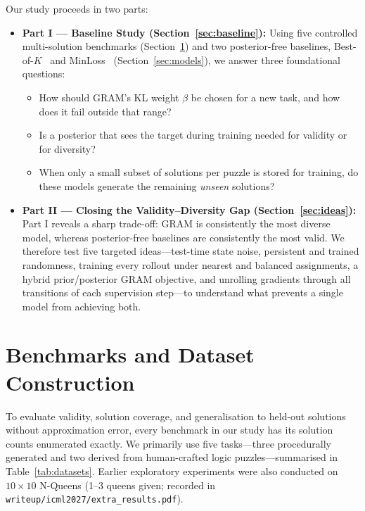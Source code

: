 \documentclass[11pt]{article}
\newcommand{\Bok}{Best-of-$K$}
\begin{document}
Our study proceeds in two parts:
\begin{itemize}
  \item \textbf{Part I --- Baseline Study (Section~\ref{sec:baseline}):} Using five controlled multi-solution benchmarks (Section~\ref{sec:datasets}) and two posterior-free baselines, \Bok{}~\cite{guzman2012,bhattacharyya2018} and MinLoss~\cite{nandwani2021} (Section~\ref{sec:models}), we answer three foundational questions:
    \begin{itemize}
      \item[\textbf{Q1:}] How should GRAM's KL weight $\beta$ be chosen for a new task, and how does it fail outside that range?
      \item[\textbf{Q2:}] Is a posterior that sees the target during training needed for validity or for diversity?
      \item[\textbf{Q3:}] When only a small subset of solutions per puzzle is stored for training, do these models generate the remaining \emph{unseen} solutions?
    \end{itemize}
  \item \textbf{Part II --- Closing the Validity--Diversity Gap (Section~\ref{sec:ideas}):} Part I reveals a sharp trade-off: GRAM is consistently the most diverse model, whereas posterior-free baselines are consistently the most valid. We therefore test five targeted ideas---test-time state noise, persistent and trained randomness, training every rollout under nearest and balanced assignments, a hybrid prior/posterior GRAM objective, and unrolling gradients through all transitions of each supervision step---to understand what prevents a single model from achieving both.
\end{itemize}

\section{Benchmarks and Dataset Construction}
\label{sec:datasets}

To evaluate validity, solution coverage, and generalisation to held-out solutions without approximation error, every benchmark in our study has its solution counts enumerated exactly. We primarily use five tasks---three procedurally generated and two derived from human-crafted logic puzzles---summarised in Table~\ref{tab:datasets}. Earlier exploratory experiments were also conducted on $10\times 10$ N-Queens (1--3 queens given; recorded in \texttt{writeup/icml2027/extra\_results.pdf}).
\end{document}
